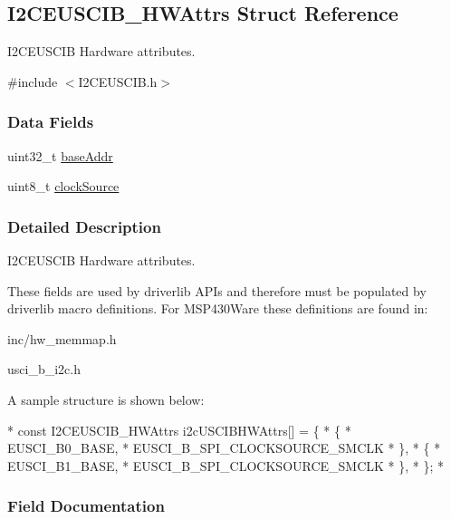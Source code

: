 \subsection{I2\-C\-E\-U\-S\-C\-I\-B\-\_\-\-H\-W\-Attrs Struct Reference}
\label{struct_i2_c_e_u_s_c_i_b___h_w_attrs}


I2\-C\-E\-U\-S\-C\-I\-B Hardware attributes.  




{\ttfamily \#include $<$I2\-C\-E\-U\-S\-C\-I\-B.\-h$>$}

\subsubsection*{Data Fields}
\begin{DoxyCompactItemize}
\item 
uint32\-\_\-t \hyperlink{struct_i2_c_e_u_s_c_i_b___h_w_attrs_ac629f3dec6ed52e4f6696c301000c0ac}{base\-Addr}
\item 
uint8\-\_\-t \hyperlink{struct_i2_c_e_u_s_c_i_b___h_w_attrs_ae90808e5895254b06d72a2c83f4f0987}{clock\-Source}
\end{DoxyCompactItemize}


\subsubsection{Detailed Description}
I2\-C\-E\-U\-S\-C\-I\-B Hardware attributes. 

These fields are used by driverlib A\-P\-Is and therefore must be populated by driverlib macro definitions. For M\-S\-P430\-Ware these definitions are found in\-:
\begin{DoxyItemize}
\item inc/hw\-\_\-memmap.\-h
\item usci\-\_\-b\-\_\-i2c.\-h
\end{DoxyItemize}

A sample structure is shown below\-: 
\begin{DoxyCode}
*  \textcolor{keyword}{const} I2CEUSCIB_HWAttrs i2cUSCIBHWAttrs[] = \{
*      \{
*          EUSCI\_B0\_BASE,
*          EUSCI\_B\_SPI\_CLOCKSOURCE\_SMCLK
*      \},
*      \{
*          EUSCI\_B1\_BASE,
*          EUSCI\_B\_SPI\_CLOCKSOURCE\_SMCLK
*      \},
*  \};
*  
\end{DoxyCode}
 

\subsubsection{Field Documentation}
